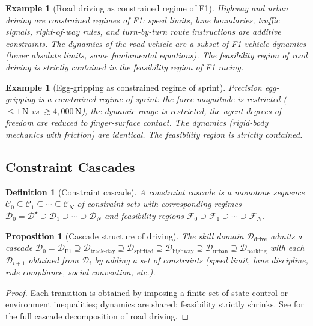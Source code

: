 \documentclass[11pt,twocolumn,a4paper]{article}
\newtheorem{proposition}[theorem]{Proposition}
\newtheorem{definition}[theorem]{Definition}
\newtheorem{example}[theorem]{Example}
\newcommand{\cF}{\mathcal{F}}
\newcommand{\cD}{\mathcal{D}}
\newcommand{\cC}{\mathcal{C}}
\begin{document}
\begin{example}[Road driving as constrained regime of F1]
Highway and urban driving are constrained regimes of F1: speed limits, lane boundaries, traffic signals, right-of-way rules, and turn-by-turn route instructions are additive constraints. The dynamics of the road vehicle are a subset of F1 vehicle dynamics (lower absolute limits, same fundamental equations). The feasibility region of road driving is strictly contained in the feasibility region of F1 racing.
\end{example}

\begin{example}[Egg-gripping as constrained regime of sprint]
Precision egg-gripping is a constrained regime of sprint: the force magnitude is restricted ($\le 1\,\mathrm{N}$ vs $\gtrsim 4{,}000\,\mathrm{N}$), the dynamic range is restricted, the agent degrees of freedom are reduced to finger-surface contact. The dynamics (rigid-body mechanics with friction) are identical. The feasibility region is strictly contained.
\end{example}

\subsection{Constraint Cascades}

\begin{definition}[Constraint cascade]
\label{def:cascade}
A \emph{constraint cascade} is a monotone sequence $\cC_0 \subseteq \cC_1 \subseteq \cdots \subseteq \cC_N$ of constraint sets with corresponding regimes $\cD_0 = \cD^\star \supseteq \cD_1 \supseteq \cdots \supseteq \cD_N$ and feasibility regions $\cF_0 \supseteq \cF_1 \supseteq \cdots \supseteq \cF_N$.
\end{definition}

\begin{proposition}[Cascade structure of driving]
The skill domain $\cD_{\text{drive}}$ admits a cascade $\cD_0 = \cD_{\text{F1}} \supseteq \cD_{\text{track-day}} \supseteq \cD_{\text{spirited}} \supseteq \cD_{\text{highway}} \supseteq \cD_{\text{urban}} \supseteq \cD_{\text{parking}}$ with each $\cD_{i+1}$ obtained from $\cD_i$ by adding a set of constraints (speed limit, lane discipline, rule compliance, social convention, etc.).
\end{proposition}

\begin{proof}
Each transition is obtained by imposing a finite set of state-control or environment inequalities; dynamics are shared; feasibility strictly shrinks. See \cite{sachikonye2026driving} for the full cascade decomposition of road driving.
\end{proof}
\end{document}
